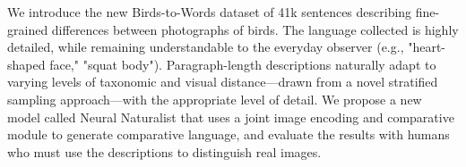 We introduce the new Birds-to-Words dataset of 41k sentences describing fine-grained differences between photographs of birds. The language collected is highly detailed, while remaining understandable to the everyday observer (e.g., "heart-shaped face," "squat body"). Paragraph-length descriptions naturally adapt to varying levels of taxonomic and visual distance—drawn from a novel stratified sampling approach—with the appropriate level of detail. We propose a new model called Neural Naturalist that uses a joint image encoding and comparative module to generate comparative language, and evaluate the results with humans who must use the descriptions to distinguish real images.